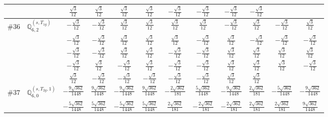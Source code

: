 \documentclass[fleqn,9pt,landscape]{jsarticle}
\begin{document}
\begin{center}
\begin{longtable}{lcccccccccc}
& $ \frac{\sqrt{3}}{12} $ & $ \frac{\sqrt{3}}{12} $ & $ \frac{\sqrt{3}}{12} $ & $ \frac{\sqrt{3}}{12} $ & $ - \frac{\sqrt{3}}{12} $ & $ - \frac{\sqrt{3}}{12} $ & $ - \frac{\sqrt{3}}{12} $ & $ - \frac{\sqrt{3}}{12} $ & $  $ & $  $ \\ \hline
$ \#36\quad \mathbb{Q}_{6,2}^{(s,T_{1g})} $ & $ - \frac{\sqrt{3}}{12} $ & $ - \frac{\sqrt{3}}{12} $ & $ \frac{\sqrt{3}}{12} $ & $ \frac{\sqrt{3}}{12} $ & $ \frac{\sqrt{3}}{12} $ & $ \frac{\sqrt{3}}{12} $ & $ - \frac{\sqrt{3}}{12} $ & $ \frac{\sqrt{3}}{12} $ & $ - \frac{\sqrt{3}}{12} $ & $ \frac{\sqrt{3}}{12} $ \\
& $ - \frac{\sqrt{3}}{12} $ & $ - \frac{\sqrt{3}}{12} $ & $ \frac{\sqrt{3}}{12} $ & $ \frac{\sqrt{3}}{12} $ & $ \frac{\sqrt{3}}{12} $ & $ - \frac{\sqrt{3}}{12} $ & $ \frac{\sqrt{3}}{12} $ & $ - \frac{\sqrt{3}}{12} $ & $ - \frac{\sqrt{3}}{12} $ & $ - \frac{\sqrt{3}}{12} $ \\
& $ - \frac{\sqrt{3}}{12} $ & $ - \frac{\sqrt{3}}{12} $ & $ \frac{\sqrt{3}}{12} $ & $ \frac{\sqrt{3}}{12} $ & $ - \frac{\sqrt{3}}{12} $ & $ - \frac{\sqrt{3}}{12} $ & $ \frac{\sqrt{3}}{12} $ & $ \frac{\sqrt{3}}{12} $ & $ \frac{\sqrt{3}}{12} $ & $ \frac{\sqrt{3}}{12} $ \\
& $ - \frac{\sqrt{3}}{12} $ & $ \frac{\sqrt{3}}{12} $ & $ - \frac{\sqrt{3}}{12} $ & $ \frac{\sqrt{3}}{12} $ & $ - \frac{\sqrt{3}}{12} $ & $ - \frac{\sqrt{3}}{12} $ & $ \frac{\sqrt{3}}{12} $ & $ \frac{\sqrt{3}}{12} $ & $ \frac{\sqrt{3}}{12} $ & $ - \frac{\sqrt{3}}{12} $ \\
& $ \frac{\sqrt{3}}{12} $ & $ - \frac{\sqrt{3}}{12} $ & $ - \frac{\sqrt{3}}{12} $ & $ - \frac{\sqrt{3}}{12} $ & $ - \frac{\sqrt{3}}{12} $ & $ - \frac{\sqrt{3}}{12} $ & $ \frac{\sqrt{3}}{12} $ & $ \frac{\sqrt{3}}{12} $ & $  $ & $  $ \\ \hline
$ \#37\quad \mathbb{Q}_{6,0}^{(s,T_{2g},1)} $ & $ - \frac{9 \sqrt{362}}{1448} $ & $ \frac{9 \sqrt{362}}{1448} $ & $ - \frac{9 \sqrt{362}}{1448} $ & $ \frac{9 \sqrt{362}}{1448} $ & $ - \frac{2 \sqrt{362}}{181} $ & $ \frac{5 \sqrt{362}}{1448} $ & $ - \frac{9 \sqrt{362}}{1448} $ & $ \frac{2 \sqrt{362}}{181} $ & $ - \frac{5 \sqrt{362}}{1448} $ & $ - \frac{9 \sqrt{362}}{1448} $ \\
& $ - \frac{5 \sqrt{362}}{1448} $ & $ \frac{5 \sqrt{362}}{1448} $ & $ - \frac{5 \sqrt{362}}{1448} $ & $ \frac{5 \sqrt{362}}{1448} $ & $ \frac{2 \sqrt{362}}{181} $ & $ - \frac{2 \sqrt{362}}{181} $ & $ - \frac{2 \sqrt{362}}{181} $ & $ \frac{2 \sqrt{362}}{181} $ & $ \frac{2 \sqrt{362}}{181} $ & $ \frac{9 \sqrt{362}}{1448} $ \\

\end{longtable}
\end{center}
\end{document}
